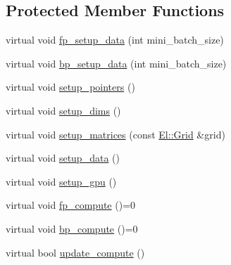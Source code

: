 \subsection*{Protected Member Functions}
\begin{DoxyCompactItemize}
\item 
virtual void \hyperlink{classlbann_1_1Layer_af311d901a5f71e4c749454647e9fd9c7}{fp\+\_\+setup\+\_\+data} (int mini\+\_\+batch\+\_\+size)
\item 
virtual void \hyperlink{classlbann_1_1Layer_af7312710c0b9ac6ebe327d0ffe22cbf0}{bp\+\_\+setup\+\_\+data} (int mini\+\_\+batch\+\_\+size)
\item 
virtual void \hyperlink{classlbann_1_1Layer_a71b7a62afd9b73c23b2c0267b8ba0981}{setup\+\_\+pointers} ()
\item 
virtual void \hyperlink{classlbann_1_1Layer_a90fce1b06c1f2abb480e18cfe08a9746}{setup\+\_\+dims} ()
\item 
virtual void \hyperlink{classlbann_1_1Layer_a57bbe21131dc00ab5cf9ea5e3656808e}{setup\+\_\+matrices} (const \hyperlink{base_8hpp_a9951bb1719d534e0401b1f06cad19eab}{El\+::\+Grid} \&grid)
\item 
virtual void \hyperlink{classlbann_1_1Layer_a50a89f8a68762c677d48efe384676e81}{setup\+\_\+data} ()
\item 
virtual void \hyperlink{classlbann_1_1Layer_a36aa22ef90ce4de65abe729d38490863}{setup\+\_\+gpu} ()
\item 
virtual void \hyperlink{classlbann_1_1Layer_a523319dd1bd87a0612afa1912bb5aad7}{fp\+\_\+compute} ()=0
\item 
virtual void \hyperlink{classlbann_1_1Layer_a7442e01f9ee1294df2de811efcf5171e}{bp\+\_\+compute} ()=0
\item 
virtual bool \hyperlink{classlbann_1_1Layer_a70e08fc96a612f67ade6ba3809536d85}{update\+\_\+compute} ()
\end{DoxyCompactItemize}
